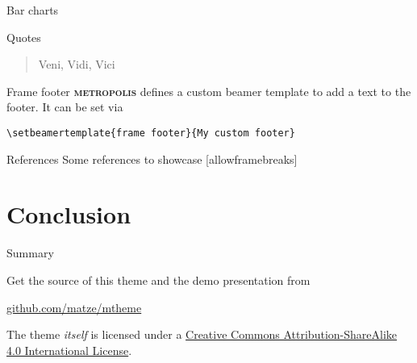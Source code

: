 \documentclass[10pt]{beamer}
\newcommand{\themename}{\textbf{\textsc{metropolis}}\xspace}
\begin{document}
\begin{frame}{Bar charts}
  \begin{figure}
  \end{figure}
\end{frame}
\begin{frame}{Quotes}
  \begin{quote}
    Veni, Vidi, Vici
  \end{quote}
\end{frame}

{%
\begin{frame}[fragile]{Frame footer}
    \themename defines a custom beamer template to add a text to the footer. It can be set via
    \begin{verbatim}\setbeamertemplate{frame footer}{My custom footer}\end{verbatim}
\end{frame}
}

\begin{frame}{References}
  Some references to showcase [allowframebreaks] \cite{knuth92,ConcreteMath,Simpson,Er01,greenwade93}
\end{frame}

\section{Conclusion}

\begin{frame}{Summary}

  Get the source of this theme and the demo presentation from

  \begin{center}\url{github.com/matze/mtheme}\end{center}

  The theme \emph{itself} is licensed under a
  \href{http://creativecommons.org/licenses/by-sa/4.0/}{Creative Commons
  Attribution-ShareAlike 4.0 International License}.

  \begin{center}\ccbysa\end{center}

\end{frame}
\end{document}
